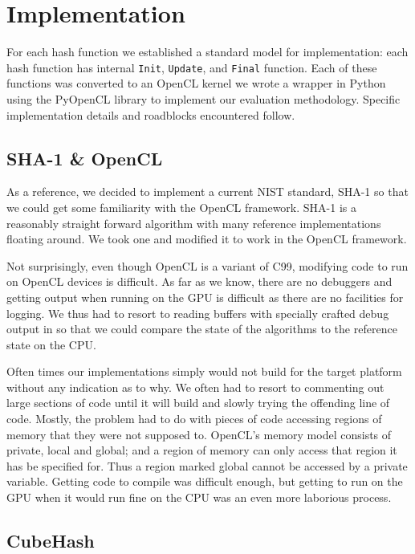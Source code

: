 \section*{Implementation}

For each hash function we established a standard model for implementation: each hash function has internal {\tt Init}, {\tt Update}, and {\tt Final} function.
Each of these functions was converted to an OpenCL kernel we wrote a wrapper in Python using the PyOpenCL library to implement our evaluation methodology.
Specific implementation details and roadblocks encountered follow.

\subsection*{SHA-1 \& OpenCL}

As a reference, we decided to implement a current NIST standard, SHA-1 so that we could get some familiarity with the OpenCL framework.
SHA-1 is a reasonably straight forward algorithm with many reference implementations floating around.
We took one and modified it to work in the OpenCL framework.

Not surprisingly, even though OpenCL is a variant of C99, modifying code to run on OpenCL devices is difficult.
As far as we know, there are no debuggers and getting output when running on the GPU is difficult as there are no facilities for logging.
We thus had to resort to reading buffers with specially crafted debug output in so that we could compare the state of the algorithms to the reference state on the CPU.

Often times our implementations simply would not build for the target platform without any indication as to why.
We often had to resort to commenting out large sections of code until it will build and slowly trying the offending line of code.
Mostly, the problem had to do with pieces of code accessing regions of memory that they were not supposed to.
OpenCL's memory model consists of private, local and global; and a region of memory can only access that region it has be specified for.
Thus a region marked global cannot be accessed by a private variable.
Getting code to compile was difficult enough, but getting to run on the GPU when it would run fine on the CPU was an even more laborious process.

\subsection*{CubeHash}


